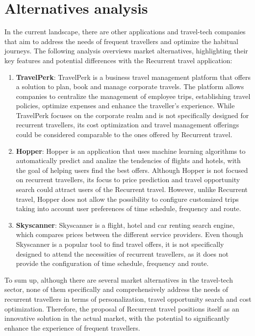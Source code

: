 \documentclass[../memory.tex]{subfiles}
\begin{document}
\section{Alternatives analysis}
In the current landscape, there are other applications and travel-tech companies
that aim to address the needs of frequent travellers and optimize the habitual
journeys. The following analysis overviews market alternatives, highlighting
their key features and potential differences with the Recurrent travel
application:
\begin{enumerate}[label = -]
	\item \textbf{TravelPerk}\cite{travel-perk}: TravelPerk is a business travel
	      management platform that offers a solution to plan, book and manage
	      corporate travels. The platform allows companies to centralize the
	      management of employee trips, establishing travel policies, optimize expenses
	      and enhance the traveller's experience. While TravelPerk focuses on the
	      corporate realm and is not specifically designed for recurrent travellers,
	      its cost optimization and travel management offerings could be considered
	      comparable to the ones offered by Recurrent travel.
	\item \textbf{Hopper}\cite{hopper}: Hopper is an application that uses machine
	      learning algorithms to automatically predict and analize the tendencies of
	      flights and hotels, with the goal of helping users find the best offers.
	      Although Hopper is not focused on recurrent travellers, its focus to price
	      prediction and travel opportunity search could attract users of the
	      Recurrent travel. However, unlike Recurrent travel, Hopper does not allow
	      the possibility to configure customized trips taking into account user
	      preferences of time schedule, frequency and route.
	\item \textbf{Skyscanner}\cite{skyscanner}: Skyscanner is a flight, hotel
	      and car renting search engine, which compares prices between the
	      different service providers. Even though Skyscanner is a popular tool
	      to find travel offers, it is not specifically designed to attend the
	      necessities of recurrent travellers, as it does not provide the
	      configuration of time schedule, frequency and route.
\end{enumerate}
To sum up, although there are several market alternatives in the travel-tech
sector, none of them specifically and comprehensively address the needs of
recurrent travellers in terms of personalization, travel opportunity search and
cost optimization. Therefore, the proposal of Recurrent travel positions itself
as an innovative solution in the actual market, with the potential to
significantly enhance the experience of frequent travellers.
\end{document}
